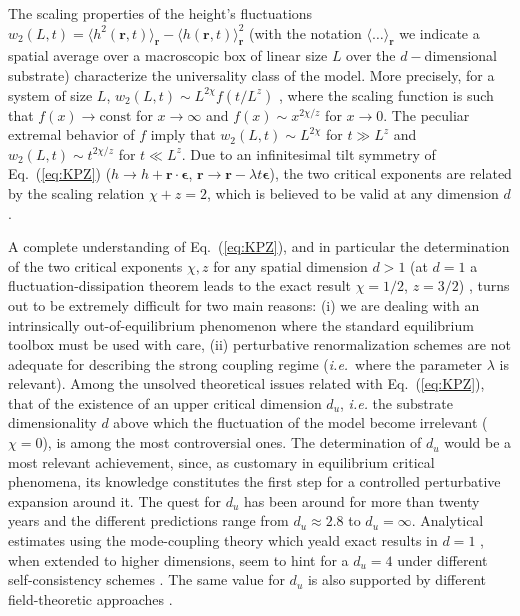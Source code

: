 \documentclass[prl,showpacs,amssymb,floatfix]{revtex4-1}
\begin{document}
The scaling properties of the height's fluctuations $w_2(L,t) =
\langle h^2 ({\mathbf r}, t) \rangle_{\mathbf r} - \langle h ({\mathbf
  r}, t) \rangle^2_{\mathbf r}$ (with the notation $\langle \dots
\rangle_{\mathbf r}$ we indicate a spatial average over a macroscopic
box of linear size $L$ over the $d-$dimensional substrate)
characterize the universality class of the model. More precisely, for
a system of size $L$, $w_2(L,t) \sim L^{2 \chi} f(t/L^z)$
\cite{FamilyVicsekBook, *BarabasiBook}, where the scaling function is
such that $f(x) \rightarrow \mathrm{const}$ for $x \rightarrow \infty$
and $f(x) \sim x^{2\chi/z}$ for $x \rightarrow 0$. The peculiar
extremal behavior of $f$ imply that $w_2(L,t) \sim L^{2\chi}$ for $t
\gg L^z$ and $w_2(L,t)\sim t^{2 \chi/z}$ for $t \ll L^z$. Due to an
infinitesimal tilt symmetry of Eq.~(\ref{eq:KPZ}) ($h\rightarrow h+{\mathbf r
}\cdot{\boldsymbol \epsilon}$, ${\mathbf r} \rightarrow {\mathbf r} -
\lambda t {\boldsymbol \epsilon} $), the two critical exponents are
related by the scaling relation $\chi + z = 2$, which is believed to
be valid at any dimension $d$.

A complete understanding of Eq.~(\ref{eq:KPZ}), and in particular the
determination of the two critical exponents $\chi,z$ for any spatial
dimension $d>1$ (at $d=1$ a fluctuation-dissipation theorem
leads to the exact result $\chi = 1/2$, $z=3/2$) , turns out to be
extremely difficult for two main reasons: (i) we are dealing with an
intrinsically out-of-equilibrium phenomenon where the standard
equilibrium toolbox must be used with care, (ii) perturbative
renormalization schemes are not adequate for describing the strong
coupling regime ({\em i.e.}~where the parameter $\lambda$ is
relevant). Among the unsolved theoretical issues related with
Eq.~(\ref{eq:KPZ}), that of the existence of an upper critical
dimension $d_u$, {\em i.e.} the substrate dimensionality $d$ above
which the fluctuation of the model become irrelevant ($\chi = 0$), is
among the most controversial ones. The determination of $d_u$ would be
a most relevant achievement, since, as customary in equilibrium
critical phenomena, its knowledge constitutes the first step for a
controlled perturbative expansion around it. The quest for $d_u$ has
been around for more than twenty years
\cite{Halpin-Healy1990,Cook-Derrida1990,
  Schwartz-Edwards1998,Bouchaud-Cates1993,*Bouchaud-Cates-Errata1993,
  DMKB1994,*MBDMBC95, Tu1994, ColaioriMoore2001, Laessig1995,
  *Laessig-Kinzelbach1997, Frogedby2006, CCDW2010, KK1989, *WK1987,
  *TLFWD1992, *Nissila1993,NOIKPZ2001,*NOIKPZ2002, CMP1998,
  *CGMMP1998,*CMMP1999} and the different predictions range from $d_u
\approx 2.8$ to $d_u = \infty$. Analytical estimates using the
mode-coupling theory which yeald exact results in $d=1$
\cite{HwaFrey1991,*FTUH1996}, when extended to higher dimensions, seem
to hint for a $d_u = 4$ under different self-consistency schemes
\cite{Schwartz-Edwards1998,Bouchaud-Cates1993,*Bouchaud-Cates-Errata1993,
  DMKB1994,*MBDMBC95,Tu1994, ColaioriMoore2001}. The same value for
$d_u$ is also supported by different field-theoretic approaches
\cite{Halpin-Healy1990,
  Laessig1995,*Laessig-Kinzelbach1997,Frogedby2006, CCDW2010}.
\end{document}
